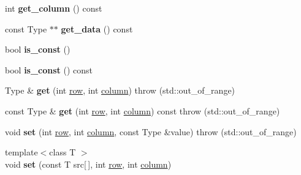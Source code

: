 \begin{DoxyCompactItemize}
\mbox{\label{classarray__2d_1_1_array__2d_a4754750259b7e261eb84c50fce26a42f}} 
int {\bfseries get\+\_\+column} () const
\item 
\mbox{\label{classarray__2d_1_1_array__2d_acc2e1e42f604d7e4d659c255fb166264}} 
const Type $\ast$$\ast$ {\bfseries get\+\_\+data} () const
\item 
\mbox{\label{classarray__2d_1_1_array__2d_ac5c501e9853106e7fe829cf010dbd1cc}} 
bool {\bfseries is\+\_\+const} ()
\item 
\mbox{\label{classarray__2d_1_1_array__2d_a9d70a21f470c0bafd844f03483675c0b}} 
bool {\bfseries is\+\_\+const} () const
\item 
\mbox{\label{classarray__2d_1_1_array__2d_a7915b02b6dae8959e527da8b780b3d4f}} 
Type \& {\bfseries get} (int \hyperlink{classarray__2d_1_1_array__2d_a17b90b53a8e0002452e96c2b7f74820b}{row}, int \hyperlink{classarray__2d_1_1_array__2d_abdf56a1c0f22088353d9a32de9680d76}{column})  throw (std\+::out\+\_\+of\+\_\+range)
\item 
\mbox{\label{classarray__2d_1_1_array__2d_add9e517d2162ff5de4927171a185dee9}} 
const Type \& {\bfseries get} (int \hyperlink{classarray__2d_1_1_array__2d_a17b90b53a8e0002452e96c2b7f74820b}{row}, int \hyperlink{classarray__2d_1_1_array__2d_abdf56a1c0f22088353d9a32de9680d76}{column}) const  throw (std\+::out\+\_\+of\+\_\+range)
\item 
\mbox{\label{classarray__2d_1_1_array__2d_a0ebf20317d3f8a6c1b58634b387ca0ed}} 
void {\bfseries set} (int \hyperlink{classarray__2d_1_1_array__2d_a17b90b53a8e0002452e96c2b7f74820b}{row}, int \hyperlink{classarray__2d_1_1_array__2d_abdf56a1c0f22088353d9a32de9680d76}{column}, const Type \&value)  throw (std\+::out\+\_\+of\+\_\+range)
\item 
\mbox{\label{classarray__2d_1_1_array__2d_a287f572e2ecf5041e04b0c93dbad60ef}} 
{\footnotesize template$<$class T $>$ }\\void {\bfseries set} (const T src\mbox{[}$\,$\mbox{]}, int \hyperlink{classarray__2d_1_1_array__2d_a17b90b53a8e0002452e96c2b7f74820b}{row}, int \hyperlink{classarray__2d_1_1_array__2d_abdf56a1c0f22088353d9a32de9680d76}{column})
$$
\end{DoxyCompactItemize}
